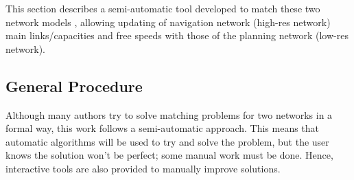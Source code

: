 This section describes a semi-automatic tool developed to match these two network models \citep[][]{Ordonez_Webpage_2011_3}, allowing updating of navigation network (high-res network) main links/capacities and free speeds with those of the planning network (low-res network).

\subsection{General Procedure}
Although many authors try to solve matching problems for two networks in a formal way, this work follows a semi-automatic approach. This means that automatic algorithms will be used to try and solve the problem, but the user knows the solution won't be perfect;  some manual work must be done. Hence, interactive tools are also provided to manually improve solutions.

